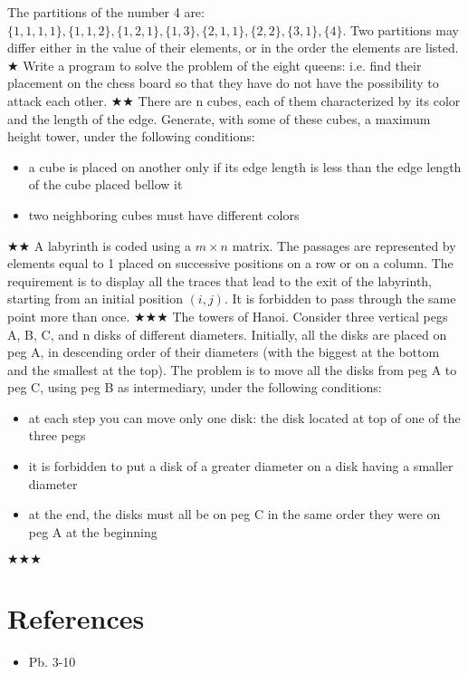 \documentclass{exam}
\newcommand\lvlez{$\bigstar$}
\newcommand\lvlmed{\lvlez\lvlez}
\newcommand\lvlhard{\lvlmed\lvlez}
\begin{document}
\begin{questions}
The partitions of the number 4 are: $\{1, 1, 1, 1\}, \{1, 1, 2\}, \{1, 2, 1\},\{1, 3\}, \{2, 1, 1\}, \{2, 2\}, \{3, 1\},
\{4\}$. Two partitions may differ either in the value of their elements, or in the order the elements are
listed. \lvlez
  \question Write a program to solve the problem of the eight queens: i.e. find their placement on the chess
board so that they have do not have the possibility to attack each other. \lvlmed
  \question There are n cubes, each of them characterized by its color and the length of the edge. Generate,
with some of these cubes, a maximum height tower, under the following conditions:
  \begin{itemize}
    \item  a cube is placed on another only if its edge length is less than the edge length of the cube placed bellow it
    \item two neighboring cubes must have different colors
  \end{itemize} \lvlmed
  \question A labyrinth is coded using a $m \times n$ matrix. The passages are represented by elements equal to 1
placed on successive positions on a row or on a column. The requirement is to display all the traces
that lead to the exit of the labyrinth, starting from an initial position $(
i, j )$. It is forbidden to pass through the same point more than once. \lvlhard
  \question The towers of Hanoi. Consider three vertical pegs A, B, C, and n disks of different diameters. Initially, all the disks are placed on peg A, in descending order of their diameters (with the biggest at the bottom and the smallest at the top). The problem is to move all the disks from peg A to peg C, using peg B as intermediary, under the following conditions:
  \begin{itemize}
    \item at each step you can move only one disk: the disk located at top of one of the three pegs
    \item it is forbidden to put a disk of a greater diameter on a disk having a smaller diameter
    \item at the end, the disks must all be on peg C in the same order they were on peg A at the beginning
  \end{itemize}
\end{questions}
\lvlhard
\medskip
\section*{References}
\begin{itemize}
  \item Pb. 3-10 \cite{cplab12}
\end{itemize}
\printbibliography[heading=none]
\end{document}
